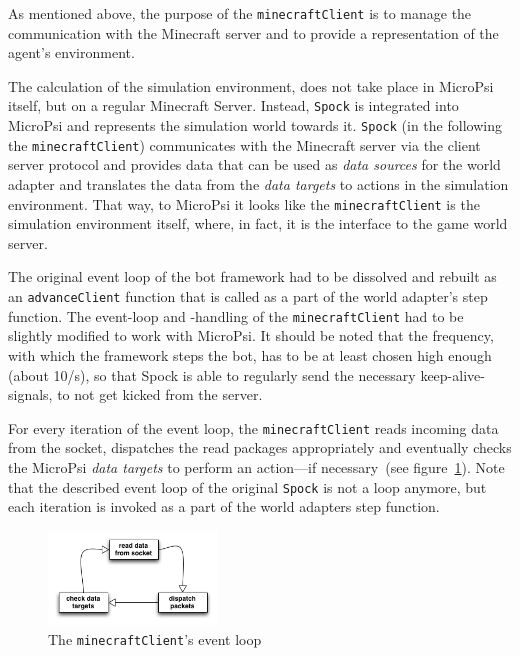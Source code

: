 As mentioned above, the purpose of the \texttt{minecraftClient} is to manage the communication with the Minecraft server and to provide a representation of the agent's environment.

The calculation of the simulation environment, does not take place in MicroPsi itself, but on a regular Minecraft Server. Instead, \texttt{Spock} is integrated into MicroPsi and represents the simulation world towards it. \texttt{Spock} (in the following the \texttt{minecraftClient}) communicates with the Minecraft server via the client server protocol and provides data that can be used as \emph{data sources} for the world adapter and translates the data from the \emph{data targets} to actions in the simulation environment. That way, to MicroPsi it looks like the \texttt{minecraftClient} is the simulation environment itself, where, in fact, it is the interface to the game world server.

The original event loop of the bot framework had to be dissolved and rebuilt as an \texttt{advanceClient} function that is called as a part of the world adapter's step function. The event-loop and -handling of the \texttt{minecraftClient} had to be slightly modified to work with MicroPsi. It should be noted that the frequency, with which the framework steps the bot, has to be at least chosen high enough (about 10/s), so that Spock is able to regularly send the necessary keep-alive-signals, to not get kicked from the server.

For every iteration of the event loop, the \texttt{minecraftClient} reads incoming data from the socket, dispatches the read packages appropriately and eventually checks the MicroPsi \emph{data targets} to perform an action---if necessary~(see figure~\ref{spock_loop}). Note that the described event loop of the original \texttt{Spock} is not a loop anymore, but each iteration is invoked as a part of the world adapters step function.


\begin{figure}
  \begin{center}
    \includegraphics[width=0.4\textwidth]{graphics/spock_eventloop}
  \end{center}
  \caption{The \texttt{minecraftClient}'s event loop}
  \label{spock_loop}
\end{figure}

